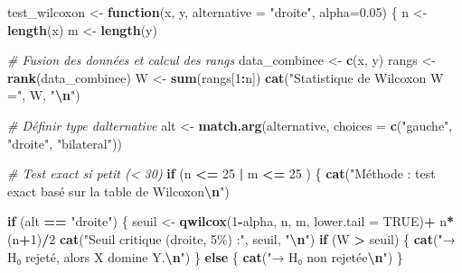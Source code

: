 \documentclass[
  12pt,
]{article}
\newenvironment{Shaded}{\begin{snugshade}}{\end{snugshade}}
\newcommand{\AttributeTok}[1]{\textcolor[rgb]{0.13,0.29,0.53}{#1}}
\newcommand{\CommentTok}[1]{\textcolor[rgb]{0.56,0.35,0.01}{\textit{#1}}}
\newcommand{\ConstantTok}[1]{\textcolor[rgb]{0.56,0.35,0.01}{#1}}
\newcommand{\ControlFlowTok}[1]{\textcolor[rgb]{0.13,0.29,0.53}{\textbf{#1}}}
\newcommand{\DecValTok}[1]{\textcolor[rgb]{0.00,0.00,0.81}{#1}}
\newcommand{\FloatTok}[1]{\textcolor[rgb]{0.00,0.00,0.81}{#1}}
\newcommand{\FunctionTok}[1]{\textcolor[rgb]{0.13,0.29,0.53}{\textbf{#1}}}
\newcommand{\NormalTok}[1]{#1}
\newcommand{\OtherTok}[1]{\textcolor[rgb]{0.56,0.35,0.01}{#1}}
\newcommand{\SpecialCharTok}[1]{\textcolor[rgb]{0.81,0.36,0.00}{\textbf{#1}}}
\newcommand{\StringTok}[1]{\textcolor[rgb]{0.31,0.60,0.02}{#1}}
\begin{document}
\begin{Shaded}
\begin{Highlighting}[]
\NormalTok{test\_wilcoxon }\OtherTok{\textless{}{-}} \ControlFlowTok{function}\NormalTok{(x, y, }\AttributeTok{alternative =} \StringTok{"droite"}\NormalTok{, }\AttributeTok{alpha=}\FloatTok{0.05}\NormalTok{) \{}
\NormalTok{  n }\OtherTok{\textless{}{-}} \FunctionTok{length}\NormalTok{(x)}
\NormalTok{  m }\OtherTok{\textless{}{-}} \FunctionTok{length}\NormalTok{(y)}
  
  \CommentTok{\# Fusion des données et calcul des rangs}
\NormalTok{  data\_combinee }\OtherTok{\textless{}{-}} \FunctionTok{c}\NormalTok{(x, y)}
\NormalTok{  rangs }\OtherTok{\textless{}{-}} \FunctionTok{rank}\NormalTok{(data\_combinee)}
\NormalTok{  W }\OtherTok{\textless{}{-}} \FunctionTok{sum}\NormalTok{(rangs[}\DecValTok{1}\SpecialCharTok{:}\NormalTok{n])}
  \FunctionTok{cat}\NormalTok{(}\StringTok{"Statistique de Wilcoxon W ="}\NormalTok{, W, }\StringTok{"}\SpecialCharTok{\textbackslash{}n}\StringTok{"}\NormalTok{)}
  
  \CommentTok{\# Définir type d\textquotesingle{}alternative}
\NormalTok{  alt }\OtherTok{\textless{}{-}} \FunctionTok{match.arg}\NormalTok{(alternative, }\AttributeTok{choices =} \FunctionTok{c}\NormalTok{(}\StringTok{"gauche"}\NormalTok{, }\StringTok{"droite"}\NormalTok{, }\StringTok{"bilateral"}\NormalTok{))}
  
  \CommentTok{\# Test exact si petit (\textless{} 30)}
  \ControlFlowTok{if}\NormalTok{ (n }\SpecialCharTok{\textless{}=} \DecValTok{25} \SpecialCharTok{|}\NormalTok{ m }\SpecialCharTok{\textless{}=} \DecValTok{25}\NormalTok{  ) \{}
    \FunctionTok{cat}\NormalTok{(}\StringTok{"Méthode : test exact basé sur la table de Wilcoxon}\SpecialCharTok{\textbackslash{}n}\StringTok{"}\NormalTok{)}
    
    \ControlFlowTok{if}\NormalTok{ (alt }\SpecialCharTok{==} \StringTok{"droite"}\NormalTok{) \{}
\NormalTok{      seuil }\OtherTok{\textless{}{-}} \FunctionTok{qwilcox}\NormalTok{(}\DecValTok{1}\SpecialCharTok{{-}}\NormalTok{alpha, n, m, }\AttributeTok{lower.tail =} \ConstantTok{TRUE}\NormalTok{)}\SpecialCharTok{+}\NormalTok{ n}\SpecialCharTok{*}\NormalTok{(n}\SpecialCharTok{+}\DecValTok{1}\NormalTok{)}\SpecialCharTok{/}\DecValTok{2}
      \FunctionTok{cat}\NormalTok{(}\StringTok{"Seuil critique (droite, 5\%) :"}\NormalTok{, seuil, }\StringTok{"}\SpecialCharTok{\textbackslash{}n}\StringTok{"}\NormalTok{)}
      \ControlFlowTok{if}\NormalTok{ (W }\SpecialCharTok{\textgreater{}}\NormalTok{ seuil) \{}
        \FunctionTok{cat}\NormalTok{(}\StringTok{"→ H₀ rejeté, alors X domine Y.}\SpecialCharTok{\textbackslash{}n}\StringTok{"}\NormalTok{)}
\NormalTok{      \} }\ControlFlowTok{else}\NormalTok{ \{}
        \FunctionTok{cat}\NormalTok{(}\StringTok{"→ H₀ non rejetée}\SpecialCharTok{\textbackslash{}n}\StringTok{"}\NormalTok{)}
\NormalTok{      \}}
      

\end{Highlighting}
\end{Shaded}
\end{document}
